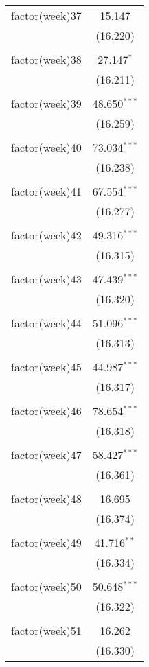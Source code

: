 \documentclass[twoside,twocolumn]{article}
\begin{document}
\begin{table}[!htbp]
\begin{tabular}{@{\extracolsep{5pt}}lc}
 factor(week)37 & 15.147 \\ 
  & (16.220) \\ 
  & \\ 
 factor(week)38 & 27.147$^{*}$ \\ 
  & (16.211) \\ 
  & \\ 
 factor(week)39 & 48.650$^{***}$ \\ 
  & (16.259) \\ 
  & \\ 
 factor(week)40 & 73.034$^{***}$ \\ 
  & (16.238) \\ 
  & \\ 
 factor(week)41 & 67.554$^{***}$ \\ 
  & (16.277) \\ 
  & \\ 
 factor(week)42 & 49.316$^{***}$ \\ 
  & (16.315) \\ 
  & \\ 
 factor(week)43 & 47.439$^{***}$ \\ 
  & (16.320) \\ 
  & \\ 
 factor(week)44 & 51.096$^{***}$ \\ 
  & (16.313) \\ 
  & \\ 
 factor(week)45 & 44.987$^{***}$ \\ 
  & (16.317) \\ 
  & \\ 
 factor(week)46 & 78.654$^{***}$ \\ 
  & (16.318) \\ 
  & \\ 
 factor(week)47 & 58.427$^{***}$ \\ 
  & (16.361) \\ 
  & \\ 
 factor(week)48 & 16.695 \\ 
  & (16.374) \\ 
  & \\ 
 factor(week)49 & 41.716$^{**}$ \\ 
  & (16.334) \\ 
  & \\ 
 factor(week)50 & 50.648$^{***}$ \\ 
  & (16.322) \\ 
  & \\ 
 factor(week)51 & 16.262 \\ 
  & (16.330) \\ 

\end{tabular}
\end{table}
\end{document}
